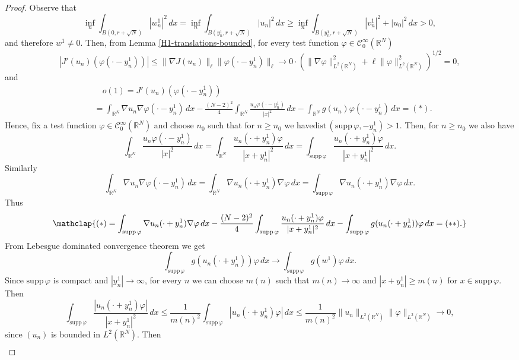 \documentclass[12pt,leqno,twoside,sort]{amsart}
\newcommand{\R}{\mathbb{R}}
\newcommand{\cC}{{\mathcal C}}
\numberwithin{equation}{section}
\newcommand{\supp}{\mathrm{supp}\,}
\begin{document}
\begin{proof}
Observe that
$$
\inf_n \int_{B(0, r+\sqrt{N})} |w_n^1|^2 \, dx 
=\inf_n \int_{B(y_n^1, r+\sqrt{N})} |u_n|^2 \, dx
\geq \inf_n \int_{B(y_n^1, r+\sqrt{N})} |v_n^1|^2+|u_0|^2 \, dx
> 0,
$$
and therefore $w^1 \neq 0$. Then, from Lemma \ref{H1-translations-bounded}, for every test function $\varphi \in \cC_0^\infty (\R^N)$
$$
|J'(u_n) (\varphi(\cdot - y_n^1))| \leq \| \nabla J(u_n) \|_\ell \| \varphi (\cdot - y_n^1) \|_\ell \to 0 \cdot \left( \| \nabla \varphi \|_{L^2 (\R^N)}^2 + \ell \| \varphi \|_{L^2 (\R^N)}^2 \right)^{1/2} = 0,
$$
and
\begin{align*}
&\quad o(1) = J'(u_n) (\varphi(\cdot - y_n^1)) \\
&= \int_{\R^N} \nabla u_n \nabla \varphi(\cdot - y_n^1) \, dx - \frac{(N-2)^2}{4} \int_{\R^N} \frac{u_n \varphi(\cdot - y_n^1)}{|x|^2} \, dx - \int_{\R^N} g(u_n) \varphi(\cdot - y_n^1) \, dx = (*).
\end{align*}
Hence, fix a test function $\varphi \in \cC_0^\infty (\R^N)$ and choose $n_0$ such that for $n \geq n_0$ we have\linebreak $\mathrm{dist}\, (\supp \varphi, -y^1_n) > 1$. Then, for $n \geq n_0$ we also have
$$
\int_{\R^N} \frac{u_n \varphi(\cdot - y_n^1)}{|x|^2} \, dx = \int_{\R^N} \frac{u_n(\cdot + y_n^1) \varphi}{|x+y_n^1|^2} \, dx = \int_{\supp \varphi} \frac{u_n(\cdot + y_n^1) \varphi}{|x+y_n^1|^2} \, dx.
$$
Similarly
$$
\int_{\R^N} \nabla u_n \nabla \varphi(\cdot - y_n^1) \, dx = \int_{\R^N} \nabla u_n(\cdot + y_n^1) \nabla \varphi \, dx = \int_{\supp \varphi} \nabla u_n(\cdot + y_n^1) \nabla \varphi \, dx.
$$
Thus
\begin{align*}
\mathclap{
(*) = \int_{\supp \varphi} \nabla u_n(\cdot + y_n^1) \nabla \varphi \, dx - \frac{(N-2)^2}{4} \int_{\supp \varphi} \frac{u_n(\cdot + y_n^1) \varphi}{|x+y_n^1|^2} \, dx - \int_{\supp \varphi} g( u_n(\cdot + y_n^1) ) \varphi \, dx = (**).}
\end{align*}
From Lebesgue dominated convergence theorem we get
$$
\int_{\supp \varphi} g( u_n(\cdot + y_n^1) ) \varphi \, dx \to \int_{\supp \varphi} g( w^1) \varphi \, dx.
$$
Since $\supp \varphi$ is compact and $|y_n^1| \to \infty$, for every $n$ we can choose $m(n)$ such that $m(n) \to \infty$ and $|x+y_n^1| \geq m(n)$ for $x\in\supp \varphi$. Then
$$
\int_{\supp \varphi} \frac{|u_n(\cdot + y_n^1) \varphi|}{|x+y_n^1|^2} \, dx \leq \frac{1}{m(n)^2} \int_{\supp \varphi} |u_n(\cdot + y_n^1) \varphi| \, dx \leq \frac{1}{m(n)^2} \|u_n\|_{L^2 (\R^N)} \| \varphi\|_{L^2 (\R^N)} \to 0,
$$
since $(u_n)$ is bounded in $L^2 (\R^N)$. Then
\begin{align*}

\end{align*}
\end{proof}
\end{document}
